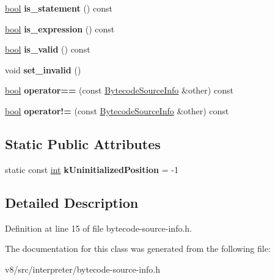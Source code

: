 \begin{DoxyCompactItemize}
\mbox{\label{classv8_1_1internal_1_1interpreter_1_1BytecodeSourceInfo_ab7b04d84ef48faf68060479bcb6d1b83}} 
\mbox{\hyperlink{classbool}{bool}} {\bfseries is\+\_\+statement} () const
\item 
\mbox{\label{classv8_1_1internal_1_1interpreter_1_1BytecodeSourceInfo_a9f8d0d124f382af48394d1cbb72a2e7f}} 
\mbox{\hyperlink{classbool}{bool}} {\bfseries is\+\_\+expression} () const
\item 
\mbox{\label{classv8_1_1internal_1_1interpreter_1_1BytecodeSourceInfo_a4bba4207673cc540b03b2272092d5f4f}} 
\mbox{\hyperlink{classbool}{bool}} {\bfseries is\+\_\+valid} () const
\item 
\mbox{\label{classv8_1_1internal_1_1interpreter_1_1BytecodeSourceInfo_ad495a11c1f25a08a473972ef0deb2046}} 
void {\bfseries set\+\_\+invalid} ()
\item 
\mbox{\label{classv8_1_1internal_1_1interpreter_1_1BytecodeSourceInfo_a7483b2e4c890d5e798bed9589e6f3b6f}} 
\mbox{\hyperlink{classbool}{bool}} {\bfseries operator==} (const \mbox{\hyperlink{classv8_1_1internal_1_1interpreter_1_1BytecodeSourceInfo}{Bytecode\+Source\+Info}} \&other) const
\item 
\mbox{\label{classv8_1_1internal_1_1interpreter_1_1BytecodeSourceInfo_a5d9867a000dfbbf07f74ba0822ce09e8}} 
\mbox{\hyperlink{classbool}{bool}} {\bfseries operator!=} (const \mbox{\hyperlink{classv8_1_1internal_1_1interpreter_1_1BytecodeSourceInfo}{Bytecode\+Source\+Info}} \&other) const
\end{DoxyCompactItemize}
\subsection*{Static Public Attributes}
\begin{DoxyCompactItemize}
\item 
\mbox{\label{classv8_1_1internal_1_1interpreter_1_1BytecodeSourceInfo_a397961cb4df1d7ce5dad893f554959ea}} 
static const \mbox{\hyperlink{classint}{int}} {\bfseries k\+Uninitialized\+Position} = -\/1
\end{DoxyCompactItemize}


\subsection{Detailed Description}


Definition at line 15 of file bytecode-\/source-\/info.\+h.



The documentation for this class was generated from the following file\+:\begin{DoxyCompactItemize}
\item 
v8/src/interpreter/bytecode-\/source-\/info.\+h\end{DoxyCompactItemize}
